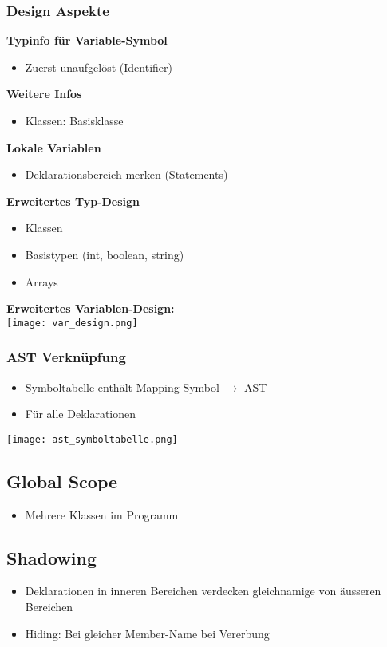 \subsubsection{Design Aspekte}
\textbf{Typinfo für Variable-Symbol}
\begin{itemize}
    \item Zuerst unaufgelöst (Identifier)
\end{itemize}
\textbf{Weitere Infos}
\begin{itemize}
    \item Klassen: Basisklasse
\end{itemize}
\textbf{Lokale Variablen}
\begin{itemize}
    \item Deklarationsbereich merken (Statements)
\end{itemize}
\textbf{Erweitertes Typ-Design}
\begin{itemize}
    \item Klassen
    \item Basistypen (int, boolean, string)
    \item Arrays
\end{itemize}
\textbf{Erweitertes Variablen-Design:}\\ 
\texttt{[image: var\_design.png]}
\subsubsection{AST Verknüpfung}
\begin{itemize}
    \item Symboltabelle enthält Mapping Symbol $\rightarrow$ AST
    \item Für alle Deklarationen
\end{itemize}
\texttt{[image: ast\_symboltabelle.png]}

\subsection{Global Scope}
\begin{itemize}
    \item Mehrere Klassen im Programm
\end{itemize}

\subsection{Shadowing}
\begin{itemize}
    \item Deklarationen in inneren Bereichen verdecken gleichnamige von äusseren Bereichen
    \item Hiding: Bei gleicher Member-Name bei Vererbung
\end{itemize}

